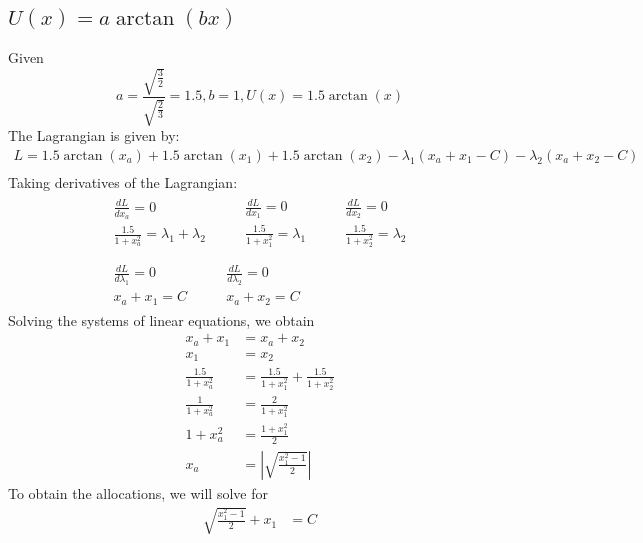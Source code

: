 \documentclass[]{article}
\newcommand{\e}{&=}
\begin{document}
\subsection{$U(x)=a\arctan(bx)$}

Given 
\[
	a = \frac{\sqrt{\frac{3}{2}}}{\sqrt{\frac{2}{3}}} = 1.5, b = 1, U(x) = 1.5 \arctan(x)
\]
The Lagrangian is given by:
\begin{gather*}
L = 1.5\arctan(x_a) + 1.5\arctan(x_1) + 1.5\arctan(x_2) - \lambda_1(x_a + x_1 - C) - \lambda_2(x_a + x_2 - C) \\
\end{gather*}
Taking derivatives of the Lagrangian:
\begin{gather*}
\begin{split}
\frac{dL}{dx_a} = 0 \\
\frac{1.5}{1 + x_a^2} = \lambda_1 + \lambda_2
\end{split} \qquad 
\begin{split}
\frac{dL}{dx_1} = 0 \\
\frac{1.5}{1 + x_1^2} = \lambda_1
\end{split} \qquad
\begin{split}
\frac{dL}{dx_2} = 0 \\
\frac{1.5}{1 + x_2^2} = \lambda_2
\end{split} \\\\
\begin{split}
\frac{dL}{d\lambda_1} = 0 \\
x_a + x_1 = C
\end{split} \qquad
\begin{split}
\frac{dL}{d\lambda_2} = 0 \\
x_a + x_2 = C
\end{split}
\end{gather*}
Solving the systems of linear equations, we obtain
\begin{align*}
x_a + x_1 \e x_a + x_2 \\
x_1 \e x_2 \\
\frac{1.5}{1 + x_a^2} \e \frac{1.5}{1 + x_1^2} + \frac{1.5}{1 + x_2^2} \\
\frac{1}{1 + x_a^2} \e \frac{2}{1 + x_1^2} \\
1 + x_a^2 \e \frac{1 + x_1^2}{2} \\
x_a \e \left| \sqrt{\frac{x_1^2 - 1}{2}} \right|
\end{align*}
To obtain the allocations, we will solve for
\begin{align*}
\sqrt{\frac{x_1^2 - 1}{2}} + x_1 \e C
\end{align*}
\end{document}
